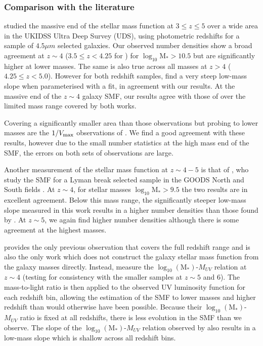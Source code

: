 \subsubsection{Comparison with the literature}
\citet{2011MNRAS.413..162C} studied the massive end of the stellar mass function at $3 \leq z \leq 5$ over a wide area in the UKIDSS Ultra Deep Survey (UDS), using photometric redshifts for a sample of $4.5\mu m$ selected galaxies. Our observed number densities show a broad agreement at $z \sim 4$ ($3.5 \leq z < 4.25$ for \citeauthor{2011MNRAS.413..162C}) for $\log_{10}\text{M}_{*} > 10.5$ but are significantly higher at lower masses. The same is also true across all masses at $z > 4$ ($4.25 \leq z < 5.0$). However for both redshift samples, \citet{2011MNRAS.413..162C} find a very steep low-mass slope when parameterised with a \citet{Schechter:1976gl} fit, in agreement with our results. At the massive end of the $z\sim4$ galaxy SMF, our results agree with those of \citet{Muzzin:2013bl} over the limited mass range covered by both works.

Covering a significantly smaller area than those observations but probing to lower masses are the $1/V_{\rm{max}}$ observations of \citet{Santini:2012jq}. We find a good agreement with these results, however due to the small number statistics at the high mass end of the SMF, the errors on both sets of observations are large.

Another measurement of the stellar mass function at $z \sim 4 - 5$ is that of \citet{2012ApJ...752...66L}, who study the SMF for a Lyman break selected sample in the GOODS North and South fields \citep{2004ApJ...600L..93G}. At $z \sim 4$, for stellar masses $\log_{10}\text{M}_{*} > 9.5$ the two results are in excellent agreement. Below this mass range, the significantly steeper low-mass slope measured in this work results in a higher number densities than those found by \citet{2012ApJ...752...66L}. At $z \sim 5$, we again find higher number densities although there is some agreement at the highest masses. 

\citet{Gonzalez:2011dn} provides the only previous observation that covers the full redshift range and is also the only work which does not construct the galaxy stellar mass function from the galaxy masses directly. Instead, \citet{Gonzalez:2011dn} measure the $\log_{10} (\text{M}_{*})$-$M_{UV}$ relation at $z \sim 4$ (testing for consistency with the smaller samples at $z \sim 5$ and 6). The mass-to-light ratio is then applied to the observed UV luminosity function for each redshift bin, allowing the estimation of the SMF to lower masses and higher redshift than would otherwise have been possible. Because their $\log_{10} (\text{M}_{*})$-$M_{UV}$ ratio is fixed at all redshifts, there is less evolution in the SMF than we observe. The slope of the $\log_{10} (\text{M}_{*})$-$M_{UV}$ relation observed by \citet{Gonzalez:2011dn} also results in a low-mass slope which is shallow across all redshift bins.

